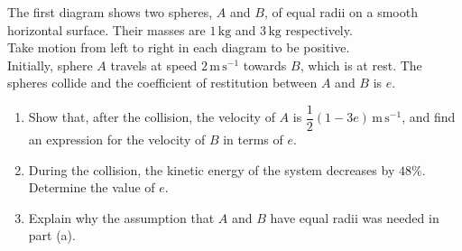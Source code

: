 \documentclass[leqno]{article}
\begin{document}
\begin{enumerate}[
  label=\textbf{\arabic*.},
  leftmargin=*,
  topsep=0pt,
  partopsep=0pt,
  parsep=0pt
]
\begin{figure}[H]
    \centering
{}
\end{figure}


The first diagram shows two spheres, $A$ and $B$, of equal radii on a smooth horizontal surface. Their masses are $1\,\mathrm{kg}$ and $3\,\mathrm{kg}$ respectively. \\

Take motion from left to right in each diagram to be positive. \\

Initially, sphere $A$ travels at speed $2\,\mathrm{m}\,\mathrm{s}^{-1}$ towards $B$, which is at rest. The spheres collide and the coefficient of restitution between $A$ and $B$ is $e$. \\
\begin{enumerate}[label=\textbf{(\alph*)}]
  \item Show that, after the collision, the velocity of $A$ is $\dfrac{1}{2}(1-3e)\,\mathrm{m}\,\mathrm{s}^{-1}$, and find an expression for the velocity of $B$ in terms of $e$.  \\
  \item During the collision, the kinetic energy of the system decreases by $48\%$. Determine the value of $e$.  \\
  \item Explain why the assumption that $A$ and $B$ have equal radii was needed in part (a).  \\
\end{enumerate}



\end{enumerate}
\end{document}
